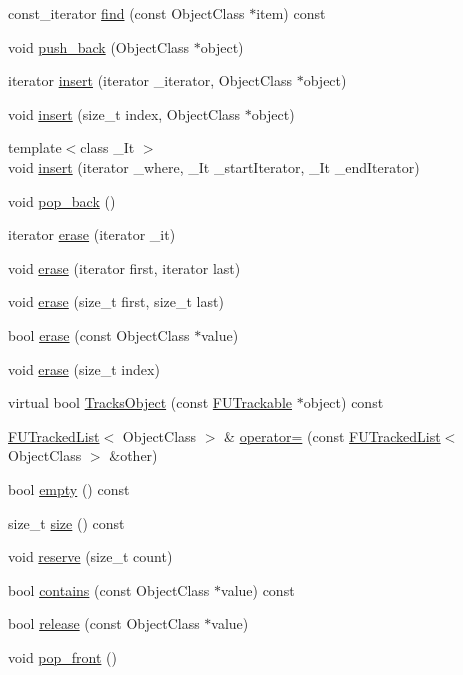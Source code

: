 \begin{DoxyCompactItemize}
\item 
const\_\-iterator \hyperlink{classFUTrackedList_ade22159f06bc941388912ca7bf6f155b}{find} (const ObjectClass $\ast$item) const 
\item 
void \hyperlink{classFUTrackedList_a95ed03da98833cc720efe8871ec40fab}{push\_\-back} (ObjectClass $\ast$object)
\item 
iterator \hyperlink{classFUTrackedList_a34c17d4a1bf1d5a4b3f7be84e6fe16dc}{insert} (iterator \_\-iterator, ObjectClass $\ast$object)
\item 
void \hyperlink{classFUTrackedList_a17216d308ba13dac2f01ecf741346014}{insert} (size\_\-t index, ObjectClass $\ast$object)
\item 
{\footnotesize template$<$class \_\-It $>$ }\\void \hyperlink{classFUTrackedList_ab6189e48c995d141272e97c99d15ec84}{insert} (iterator \_\-where, \_\-It \_\-startIterator, \_\-It \_\-endIterator)
\item 
void \hyperlink{classFUTrackedList_a5301cc416c6a5067d630b5a73eea2ad8}{pop\_\-back} ()
\item 
iterator \hyperlink{classFUTrackedList_a8d1e300064559488107187976f813386}{erase} (iterator \_\-it)
\item 
void \hyperlink{classFUTrackedList_adf935cdfe7598293f763c4ae7f24e300}{erase} (iterator first, iterator last)
\item 
void \hyperlink{classFUTrackedList_a2184b185e53a253e0233921db43da79c}{erase} (size\_\-t first, size\_\-t last)
\item 
bool \hyperlink{classFUTrackedList_a1b1ddb3de169490cc96bf5d2de2619f9}{erase} (const ObjectClass $\ast$value)
\item 
void \hyperlink{classFUTrackedList_aad03167cf0af9eb14597a5bde9c9aa4a}{erase} (size\_\-t index)
\item 
virtual bool \hyperlink{classFUTrackedList_aa63f9fba707a10b006cda1f8baf125b0}{TracksObject} (const \hyperlink{classFUTrackable}{FUTrackable} $\ast$object) const 
\item 
\hyperlink{classFUTrackedList}{FUTrackedList}$<$ ObjectClass $>$ \& \hyperlink{classFUTrackedList_a14a3605c6453a24a61a681af1a3d7f69}{operator=} (const \hyperlink{classFUTrackedList}{FUTrackedList}$<$ ObjectClass $>$ \&other)
\item 
bool \hyperlink{classFUTrackedList_a0219343188d5ee72516e9bef1609489c}{empty} () const 
\item 
size\_\-t \hyperlink{classFUTrackedList_a4d1e76713092ed2bf08c982e78fe4bd2}{size} () const 
\item 
void \hyperlink{classFUTrackedList_a34cbbb2273ffda83a32cb6ae7e77f644}{reserve} (size\_\-t count)
\item 
bool \hyperlink{classFUTrackedList_a463ffe1ab7a33bedf26cc47f516b5371}{contains} (const ObjectClass $\ast$value) const 
\item 
bool \hyperlink{classFUTrackedList_a92eaa0b3fdf974082bec7ac63c9bf86e}{release} (const ObjectClass $\ast$value)
\item 
void \hyperlink{classFUTrackedList_ac8852b52fe35d11dc65ba87161431a81}{pop\_\-front} ()
\end{DoxyCompactItemize}
